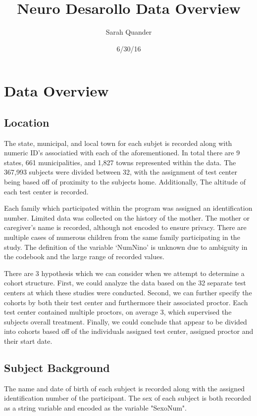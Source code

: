 

\title{Neuro Desarollo Data Overview}
\author{ Sarah Quander}
\date {6/30/16}
\section{Data Overview}

\subsection{Location}
The state, municipal, and local town for each subjet is recorded along with numeric ID's associatied with each of the aforementioned. In total there are 9 states, 661 municipalities, and 1,827 towns represented within the data. The 367,993 subjects were divided between 32, with the assignment of test center being based off of proximity to the subjects home. Additionally, The altitude of each test center is recorded.

Each family which participated within the program was assigned an identification number. Limited data was collected on the history of the mother. The mother or caregiver's name is recorded, although not encoded to ensure privacy. There are multiple cases of numerous children from the same family participating in the study. The definition of the variable `NumNino' is unknown due to ambiguity in the codebook and the large range of recorded values.

There are 3 hypothesis which we can consider when we attempt to determine a cohort structure. First, we could analyze the data based on the 32 separate test centers at which these studies were conducted. Second, we can further specify the cohorts by both their test center and furthermore their associated proctor. Each test center contained multiple proctors, on average 3, which supervised the subjects overall treatment. Finally, we could conclude that appear to be divided into cohorts based off of the individuals assigned test center, assigned proctor and their start date.

\subsection{Subject Background}
The name and date of birth of each subject is recorded along with the assigned identification number of the participant. The sex of each subject is both recorded as a string variable and encoded as the variable "SexoNum".  

